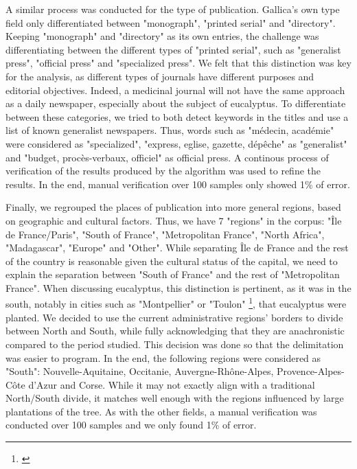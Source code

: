 A similar process was conducted for the type of publication. Gallica's own type field only differentiated between "monograph", "printed serial" and "directory". Keeping "monograph" and "directory" as its own entries, the challenge was differentiating between the different types of "printed serial", such as "generalist press", "official press" and "specialized press". We felt that this distinction was key for the analysis, as different types of journals have different purposes and editorial objectives. Indeed, a medicinal journal will not have the same approach as a daily newspaper, especially about the subject of eucalyptus. To differentiate between these categories, we tried to both detect keywords in the titles and use a list of known generalist newspapers. Thus, words such as "médecin, académie" were considered as "specialized", "express, eglise, gazette, dépêche" as "generalist" and "budget, procès-verbaux, officiel" as official press. A continous process of verification of the results produced by the algorithm was used to refine the results. In the end, manual verification over 100 samples only showed 1\% of error.


Finally, we regrouped the places of publication into more general regions, based on geographic and cultural factors. Thus, we have 7 "regions" in the corpus: "Île de France/Paris", "South of France", "Metropolitan France", "North Africa", "Madagascar", "Europe" and "Other". While separating Île de France and the rest of the country is reasonable given the cultural status of the capital, we need to explain the separation between "South of France" and the rest of "Metropolitan France". When discussing eucalyptus, this distinction is pertinent, as it was in the south, notably in cities such as "Montpellier" or "Toulon" \footnote{\cite[45]{doughty_eucalyptus_2000}}, that eucalyptus were planted. We decided to use the current administrative regions' borders to divide between North and South, while fully acknowledging that they are anachronistic compared to the period studied. This decision was done so that the delimitation was easier to program. In the end, the following regions were considered as "South": Nouvelle-Aquitaine, Occitanie, Auvergne-Rhône-Alpes, Provence-Alpes-Côte d'Azur and Corse. While it may not exactly align with a traditional North/South divide, it matches well enough with the regions influenced by large plantations of the tree. As with the other fields, a manual verification was conducted over 100 samples and we only found 1\% of error.



